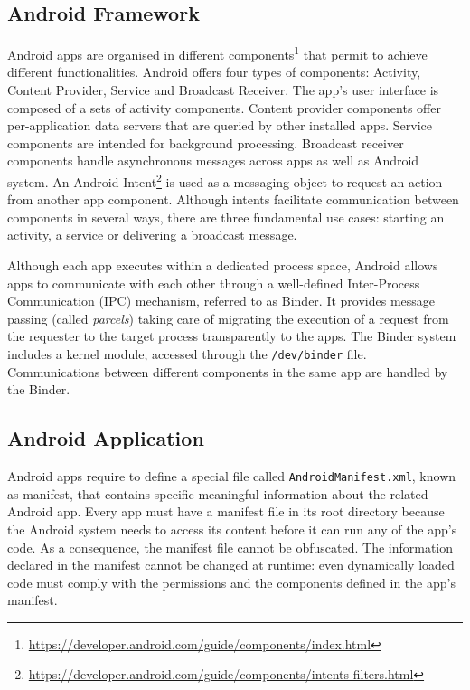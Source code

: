 \subsection{Android Framework}

Android apps are organised in different components\footnote{\url{https://developer.android.com/guide/components/index.html}} that permit to achieve different functionalities. Android offers four types of components: Activity,  Content Provider, Service and Broadcast Receiver. The app's user interface is composed of a sets of activity components. Content provider components offer per-application data servers that are queried by other installed apps. Service components are intended for background processing. Broadcast receiver components handle asynchronous messages across apps as well as Android system. An Android Intent\footnote{\url{https://developer.android.com/guide/components/intents-filters.html}} is used as a messaging object to request an action from another app component. Although intents facilitate communication between components in several ways, there are three fundamental use cases: starting an activity, a service or delivering a broadcast message.

Although each app executes within a dedicated process space, Android allows apps to communicate with each other through a well-defined Inter-Process Communication (IPC) mechanism, referred to as Binder. It provides message passing (called \textit{parcels}) taking care of migrating the execution of a request from the requester to the target process transparently to the apps. The Binder system includes a kernel module, accessed through the \texttt{/dev/binder} file. Communications between different components in the same app are handled by the Binder.  


\subsection{Android Application} 
Android apps require to define a special file called \texttt{AndroidManifest.xml}, known as manifest\cite{manifest}, that contains specific meaningful information about the related Android app. Every app must have a manifest file in its root directory because the Android system needs to access its content before it can run any of the app's code. As a consequence, the manifest file cannot be obfuscated. The information declared in the manifest  cannot be changed at runtime: even  dynamically loaded code must comply with the permissions and the components defined in the app's manifest.

